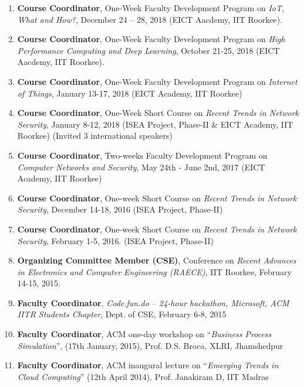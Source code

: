 \begin{enumerate} %

\item 
\textbf{Course Coordinator}, One-Week Faculty Development Program on \textit{IoT, What and How?}, December 24 – 28, 2018 (EICT Aacdemy, IIT Roorkee).
\item 
\textbf{Course Coordinator}, One-Week Faculty Development Program on \textit{High Performance Computing and Deep Learning}, October 21-25, 2018 (EICT Aacdemy, IIT Roorkee).
\item
\textbf{Course Coordinator}, One-Week Faculty Development Program on \textit{Internet of Things}, January 13-17, 2018 (EICT Academy, IIT Roorkee)

\item
\textbf{Course Coordinator}, One-Week Short Course on \textit{Recent Trends in Network Security}, January 8-12, 2018 (ISEA Project, Phase-II \& EICT Academy, IIT Roorkee) (Invited 3 international speakers)

\item
\textbf{Course Coordinator}, Two-weeks Faculty Development Program on \textit{Computer Networks and Security}, May 24th - June 2nd, 2017 (EICT Academy, IIT Roorkee)

\item
\textbf{Course Coordinator}, One-week Short Course on \textit{Recent Trends in Network Security}, December 14-18, 2016 (ISEA Project, Phase-II)

\item
\textbf{Course Coordinator}, One-week Short Course on \textit{Recent Trends in Network Security}, February 1-5, 2016. (ISEA Project, Phase-II)

\item
\textbf{Organizing Committee Member (CSE)}, Conference on \textit{Recent Advances in Electronics and Computer Engineering (RAECE)}, IIT Roorkee, February 14-15, 2015.

\item
\textbf{Faculty Coordinator}, \textit{Code.fun.do – 24-hour hackathon, Microsoft, ACM IITR Students Chapter}, Dept. of CSE, February 6-8, 2015

\item
\textbf{Faculty Coordinator}, ACM one-day workshop on “\textit{Business Process Simulation}”, (17th January, 2015), Prof. D.S. Broca, XLRI, Jhamshedpur

\item
\textbf{Faculty Coordinator}, ACM inaugural lecture on “\textit{Emerging Trends in Cloud Computing}” (12th April 2014), Prof. Janakiram D, IIT Madras 


\end{enumerate}
